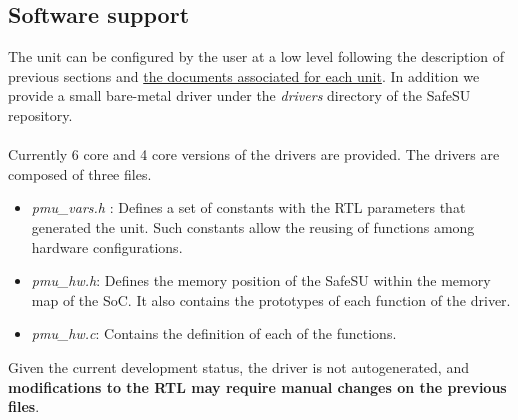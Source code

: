 \subsection{Software support}
The unit can be configured by the user at a low level following the description of previous sections and \href{https://gitlab.bsc.es/caos_hw/hdl_ip/bsc_pmu/-/tree/develop/docs}{the documents associated for each unit}. In addition we provide a small bare-metal driver under the \textit{drivers} directory of the SafeSU repository.\\
\\
Currently 6 core and 4 core versions of the drivers are provided. The drivers are composed of three files.
\begin{itemize}
\item \textit{pmu\_vars.h }: Defines a set of constants with the RTL parameters that generated the unit. Such constants allow the reusing of functions among hardware configurations.
\item\textit{ pmu\_hw.h}: Defines the memory position of the SafeSU within the memory map of the SoC. It also contains the prototypes of each function of the driver.
\item \textit{pmu\_hw.c}: Contains the definition of each of the functions.
\end{itemize}
Given the current development status, the driver is not autogenerated, and \textbf{modifications to the RTL may require manual changes on the previous files}. 

